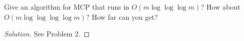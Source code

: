     \begin{thm}{}{}
        Give an algorithm for MCP that runs in $O(m\log\log\log m)$? How about $O(m\log\log\log\log m)$?
        How far can you get?
    \end{thm}
    \begin{proof}[Solution]
        See Problem 2.
    \end{proof}
